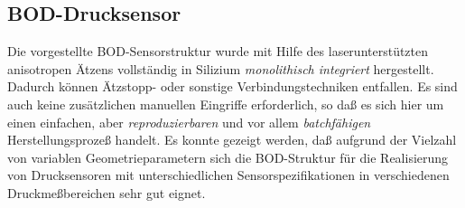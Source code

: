 \subsection{BOD-Drucksensor}

Die vorgestellte BOD-Sensorstruktur wurde mit Hilfe des laserunterstützten
anisotropen Ätzens vollständig in Silizium {\em monolithisch integriert}
hergestellt. Dadurch können Ätzstopp- \cite{Gre88} oder sonstige
Verbindungstechniken \cite{Par92} entfallen. Es sind auch keine zusätzlichen
manuellen Eingriffe \cite{Bus91a} erforderlich, so daß es sich hier um
einen einfachen, aber {\em reproduzierbaren} und vor allem {\em batchfähigen}
Herstellungsprozeß handelt. Es konnte gezeigt werden, daß aufgrund der
Vielzahl von variablen Geometrieparametern sich die BOD-Struktur für die
Realisierung von Drucksensoren mit unterschiedlichen Sensorspezifikationen
in verschiedenen Druckmeßbereichen sehr gut eignet.
